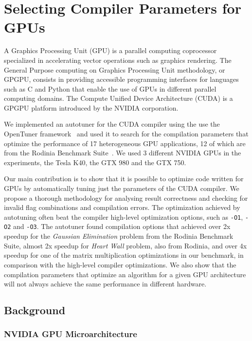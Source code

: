 \section{Selecting Compiler Parameters for GPUs}
\label{sec:paramSelGPU}

A Graphics Processing Unit (GPU) is a parallel computing coprocessor
specialized in accelerating vector operations such as graphics rendering. The
General Purpose computing on Graphics Processing Unit methodology, or GPGPU,
consists in providing accessible programming interfaces for languages such as C
and Python that enable the use of GPUs in different parallel computing domains.
The Compute Unified Device Architecture (CUDA) is a GPGPU platform introduced
by the NVIDIA corporation.

We implemented an autotuner for the CUDA compiler using the use
the OpenTuner framework~\cite{ansel2014opentuner} and used it to search for the
compilation parameters that optimize the performance of 17 heterogeneous GPU
applications, 12 of which are from the Rodinia Benchmark
Suite~\cite{che2009rodinia}.  We used 3 different NVIDIA GPUs in the
experiments, the Tesla K40, the GTX 980 and the GTX 750.

Our main contribution is to show that it is possible to optimize code written
for GPUs by automatically tuning just the parameters of the CUDA compiler. We
propose a thorough methodology for analysing result correctness and checking
for invalid flag combinations and compilation errors.  The optimization
achieved by autotuning often beat the compiler high-level optimization options,
such as \texttt{-O1}, \texttt{-O2} and \texttt{-O3}.  The autotuner found
compilation options that achieved over 2x speedup for the \textit{Gaussian
Elimination} problem from the Rodinia Benchmark Suite, almost 2x speedup for
\emph{Heart Wall} problem, also from Rodinia, and over 4x speedup for one of
the matrix multiplication optimizations in our benchmark, in comparison with
the high-level compiler optimizations.  We also show that the compilation
parameters that optimize an algorithm for a given GPU architecture will not
always achieve the same performance in different hardware.

\subsection{Background}

\subsubsection{NVIDIA GPU Microarchitecture}
\label{sec:GPUsCUDA}

